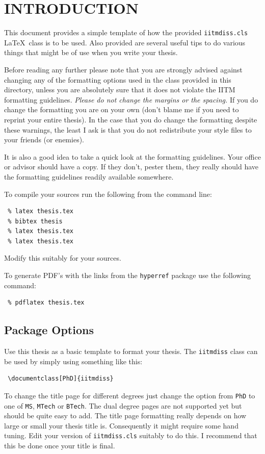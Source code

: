 \chapter{INTRODUCTION} \label{chap:intro}
 
 This document provides a simple template of how the provided
 \verb+iitmdiss.cls+ \LaTeX\ class is to be used.  Also provided are
 several useful tips to do various things that might be of use when you
 write your thesis.
 
 Before reading any further please note that you are strongly advised
 against changing any of the formatting options used in the class
 provided in this directory, unless you are absolutely sure that it
 does not violate the IITM formatting guidelines.  \emph{Please do not
   change the margins or the spacing.}  If you do change the formatting
 you are on your own (don't blame me if you need to reprint your entire
 thesis).  In the case that you do change the formatting despite these
 warnings, the least I ask is that you do not redistribute your style
 files to your friends (or enemies).
 
 It is also a good idea to take a quick look at the formatting
 guidelines.  Your office or advisor should have a copy.  If they
 don't, pester them, they really should have the formatting guidelines
 readily available somewhere.
 
 To compile your sources run the following from the command line:
 \begin{verbatim}
 % latex thesis.tex
 % bibtex thesis
 % latex thesis.tex
 % latex thesis.tex
 \end{verbatim}
 Modify this suitably for your sources.
 
 To generate PDF's with the links from the \verb+hyperref+ package use
 the following command:
 \begin{verbatim}
 % pdflatex thesis.tex
 \end{verbatim}
 
 \section{Package Options}
 
 Use this thesis as a basic template to format your thesis.  The
 \verb+iitmdiss+ class can be used by simply using something like this:
 \begin{verbatim}
 \documentclass[PhD]{iitmdiss}  
 \end{verbatim}
 
 To change the title page for different degrees just change the option
 from \verb+PhD+ to one of \verb+MS+, \verb+MTech+ or \verb+BTech+.
 The dual degree pages are not supported yet but should be quite easy
 to add.  The title page formatting really depends on how large or
 small your thesis title is.  Consequently it might require some hand
 tuning.  Edit your version of \verb+iitmdiss.cls+ suitably to do this.
 I recommend that this be done once your title is final.
 
